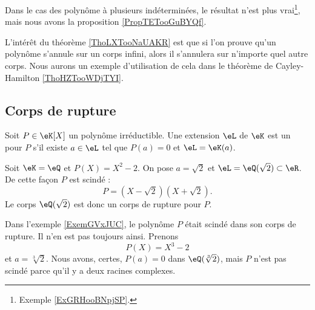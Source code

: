 \begin{remark}
    Dans le cas des polynôme à plusieurs indéterminées, le résultat n'est plus vrai\footnote{Exemple \ref{ExGRHooBNpjSP}.}, mais nous avons la proposition \ref{PropTETooGuBYQf}.
\end{remark}

\begin{remark}
    L'intérêt du théorème \ref{ThoLXTooNaUAKR} est que si l'on prouve qu'un polynôme s'annule sur un corps infini, alors il s'annulera sur n'importe quel autre corps. Nous aurons un exemple d'utilisation de cela dans le théorème de Cayley-Hamilton \ref{ThoHZTooWDjTYI}.
\end{remark}

\subsection{Corps de rupture}

\begin{definition}
    Soit \( P\in\eK[X]\) un polynôme irréductible. Une extension \( \eL\) de \( \eK\) est un  pour \( P\) s'il existe \( a\in \eL\) tel que \( P(a)=0\) et \( \eL=\eK(a)\).
\end{definition}

\begin{example}     \label{ExemGVxJUC}
    Soit \( \eK=\eQ\) et \( P(X)=X^2-2\). On pose \( a=\sqrt{2}\) et \( \eL=\eQ(\sqrt{2})\subset\eR\). De cette façon \( P\) est scindé :
    \begin{equation}
        P=(X-\sqrt{2})(X+\sqrt{2}).
    \end{equation}
    Le corps \( \eQ(\sqrt{2})\) est donc un corps de rupture pour \( P\).
\end{example}

\begin{example}
    Dans l'exemple \ref{ExemGVxJUC}, le polynôme \( P\) était scindé dans son corps de rupture. Il n'en est pas toujours ainsi. Prenons 
    \begin{equation}
        P(X)=X^3-2
    \end{equation}
    et \( a=\sqrt[3]{2}\). Nous avons, certes, \( P(a)=0\) dans \( \eQ(\sqrt[3]{2})\), mais \( P\) n'est pas scindé parce qu'il y a deux racines complexes.
\end{example}

